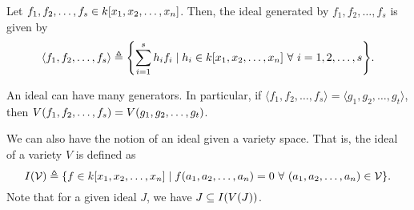 \documentclass[twoside]{article}
\begin{document}
\begin{definition}
    Let \(f_1, f_2, \ldots, f_s \in k[x_1, x_2, \ldots, x_n]\). Then, the
    ideal generated by \(f_1, f_2, \ldots, f_s\) is given by
    \begin{equation}
        \langle f_1, f_2, \ldots, f_s \rangle \triangleq \cbrak*{\sum_{i=1}^{s}h_i f_i \mid h_i \in k\sbrak{x_1, x_2, \ldots, x_n}\ \forall\ i = 1, 2, \ldots, s}.
        \label{eq:ideal-gen}
    \end{equation}
\end{definition}
An ideal can have many generators. In particular, if \(\langle f_1, f_2, \ldots,
f_s \rangle = \langle g_1, g_2, \ldots, g_t \rangle\), then \(V(f_1, f_2,
\ldots, f_s) = V(g_1, g_2, \ldots, g_t)\).

We can also have the notion of an ideal given a variety space. That is, the
ideal of a variety \(V\) is defined as
\begin{equation}
    I\brak{\cV} \triangleq \cbrak*{f \in k\sbrak{x_1, x_2, \ldots, x_n} \mid f\brak{a_1, a_2, \ldots, a_n} = 0\ \forall\ \brak{a_1, a_2, \ldots, a_n} \in \cV}.
    \label{eq:ideal-variety}
\end{equation}
Note that for a given ideal \(J\), we have \(J \subseteq I(V(J))\).
\end{document}
